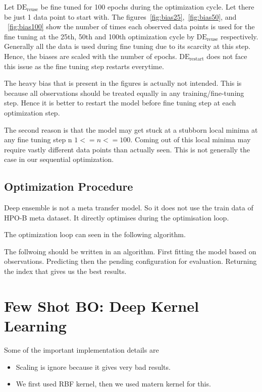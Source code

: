 \documentclass[11pt]{report}
\begin{document}
Let $\textrm{DE}_{\textrm{reuse}}$ be fine tuned for 100 epochs during the optimization cycle.
Let there be just 1 data point to start with.
The figures~\ref{fig:bias25},~\ref{fig:bias50},  and ~\ref{fig:bias100} show the number of times each observed data points is used for the fine tuning at the 25th, 50th and 100th optimization cycle by $\textrm{DE}_{\textrm{reuse}}$  respectively.
Generally all the data is used during fine tuning due to its scarcity at this step.
Hence, the biases are scaled with the number of epochs.
$\textrm{DE}_{\textrm{restart}}$ does not face this issue as the fine tuning step restarts everytime.

The heavy bias that is present in the figures is actually not intended.
This is because all observations should be treated equally in any training/fine-tuning step.
Hence it is better to restart the model before fine tuning step at each optimization step.

The second reason is that the model may get stuck at a stubborn local minima at any fine tuning step n $1 <= n <= 100$.
Coming out of this local minima may require vastly different data points than actually seen.
This is not generally the case in our sequential optimization.

\subsection{Optimization Procedure}
Deep ensemble is not a meta transfer model.
So it does not use the train data of HPO-B meta dataset.
It directly optimises during the optimisation loop.

The optimization loop can seen in the following algorithm.

The follwoing should be written in an algorithm.
First fitting the model based on observations.
Predicting then the pending configuration for evaluation.
Returning the index that gives us the best results.

\section{Few Shot BO: Deep Kernel Learning}

Some of the important implementation details are
\begin{itemize}
\item Scaling is ignore because it gives very bad results.
\item We first used RBF kernel,  then we used matern kernel for this.
\end{itemize}
\end{document}
